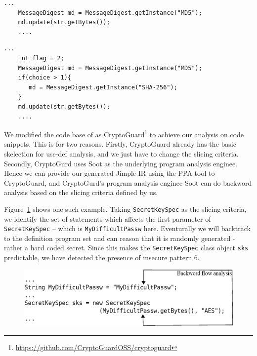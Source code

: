 \begin{lstlisting}[caption={A code snippet where keyword based detection work well}, label={fig:aes-without-vars}]
    ...
    MessageDigest md = MessageDigest.getInstance("MD5");
    md.update(str.getBytes());
    ....
\end{lstlisting}

\begin{lstlisting}[caption={A code snippet where keyword based detection introduces FP}, label={fig:aes-with-vars}]
    ...
    int flag = 2;
    MessageDigest md = MessageDigest.getInstance("MD5");
    if(choice > 1){
       md = MessageDigest.getInstance("SHA-256");
    }
    md.update(str.getBytes());
    ....
\end{lstlisting}


We modified the code base of  as CryptoGuard\footnote{\url{https://github.com/CryptoGuardOSS/cryptoguard}} to achieve our analysis on code snippets. 
This is for two reasons. Firstly, CryptoGuard already has the basic skelection for use-def analysis, and we just have to change the slicing criteria. 
Secondly, CryptoGurd uses Soot as the underlying program analysis enginee. 
Hence we can provide our generated Jimple IR using the PPA tool to CryptoGuard, and   
CryptoGurd's program analysis enginee Soot can do backword analysis based on the slicing criteria defined by us.

Figure~\ref{fig:slicing} shows one such example. Taking \texttt{SecretKeySpec} as the slicing criteria, 
we identify the set of statements which affects the first parameter of \texttt{SecretKeySpec} -- 
which is \texttt{MyDifficultPassw} here. Eventurally we will backtrack to the definition program set and can reason 
that it is randomly generated - rather a hard coded  secret. Since this makes the \texttt{SecretKeySpec} class object \texttt{sks} predictable,
 we have detected the presence of insecure pattern 6.

\begin{figure}[ht]
\includegraphics[width=\linewidth]{Figures/bckfwanalysis.eps}
\caption{}
\label{fig:slicing}
\end{figure}

